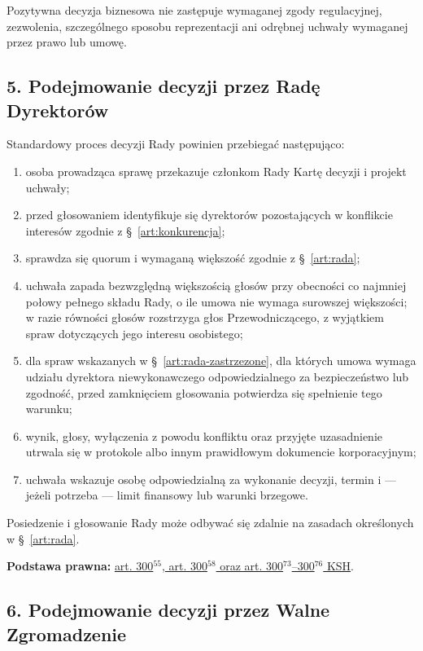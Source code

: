 \documentclass[12pt,a4paper]{report}
\begin{document}
Pozytywna decyzja biznesowa nie zastępuje wymaganej zgody regulacyjnej, zezwolenia, szczególnego sposobu reprezentacji ani odrębnej uchwały wymaganej przez prawo lub umowę.

\subsection*{5. Podejmowanie decyzji przez Radę Dyrektorów}

Standardowy proces decyzji Rady powinien przebiegać następująco:
\begin{enumerate}
  \item osoba prowadząca sprawę przekazuje członkom Rady Kartę decyzji i projekt uchwały;
  \item przed głosowaniem identyfikuje się dyrektorów pozostających w konflikcie interesów zgodnie z §~\ref{art:konkurencja};
  \item sprawdza się quorum i wymaganą większość zgodnie z §~\ref{art:rada};
  \item uchwała zapada bezwzględną większością głosów przy obecności co najmniej połowy pełnego składu Rady, o ile umowa nie wymaga surowszej większości; w razie równości głosów rozstrzyga głos Przewodniczącego, z wyjątkiem spraw dotyczących jego interesu osobistego;
  \item dla spraw wskazanych w §~\ref{art:rada-zastrzezone}, dla których umowa wymaga udziału dyrektora niewykonawczego odpowiedzialnego za bezpieczeństwo lub zgodność, przed zamknięciem głosowania potwierdza się spełnienie tego warunku;
  \item wynik, głosy, wyłączenia z powodu konfliktu oraz przyjęte uzasadnienie utrwala się w protokole albo innym prawidłowym dokumencie korporacyjnym;
  \item uchwała wskazuje osobę odpowiedzialną za wykonanie decyzji, termin i — jeżeli potrzeba — limit finansowy lub warunki brzegowe.
\end{enumerate}

Posiedzenie i głosowanie Rady może odbywać się zdalnie na zasadach określonych w §~\ref{art:rada}.

\textbf{Podstawa prawna:} \href{https://eli.gov.pl/api/acts/DU/2024/18/text.html}{art. 300$^{55}$, art. 300$^{58}$ oraz art. 300$^{73}$--300$^{76}$ KSH}.

\subsection*{6. Podejmowanie decyzji przez Walne Zgromadzenie}
\end{document}
